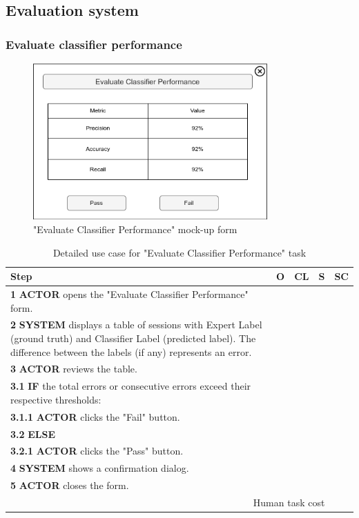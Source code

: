 \subsection{Evaluation system}

\subsubsection{Evaluate classifier performance}

\begin{figure}[H]
\centering
\includegraphics[width=0.8\textwidth]{figures/evaluate_classifier_performance.png}
\caption{"Evaluate Classifier Performance" mock-up form}
\end{figure}

\begin{table}[H]
\centering
\begin{tabular}{|p{10cm}|c|c|c|c|}
\hline
\textbf{Step} & \textbf{O} & \textbf{CL} & \textbf{S} & \textbf{SC} \\
\hline
\textbf{1} \textbf{ACTOR} opens the "Evaluate Classifier Performance" form. & & & & \\
\hline
\textbf{2} \textbf{SYSTEM} displays a table of sessions with Expert Label (ground truth) and Classifier Label (predicted label). 
The difference between the labels (if any) represents an error. & & & & \\
\hline
\textbf{3} \textbf{ACTOR} reviews the table. & & & & \\
\hline
\textbf{3.1} \textbf{IF} the total errors or consecutive errors exceed their respective thresholds: & & & & \\
\hline
\textbf{3.1.1} \textbf{ACTOR} clicks the "Fail" button. & & & & \\
\hline
\textbf{3.2} \textbf{ELSE} & & & & \\
\hline
\textbf{3.2.1} \textbf{ACTOR} clicks the "Pass" button. & & & & \\
\hline
\textbf{4} \textbf{SYSTEM} shows a confirmation dialog. & & & & \\
\hline
\textbf{5} \textbf{ACTOR} closes the form. & & & & \\
\hline
\multicolumn{4}{|r|}{Human task cost} & \\
\hline
\end{tabular}
\caption{Detailed use case for "Evaluate Classifier Performance" task}
\label{table:evaluate_classifier_performance}
\end{table}
